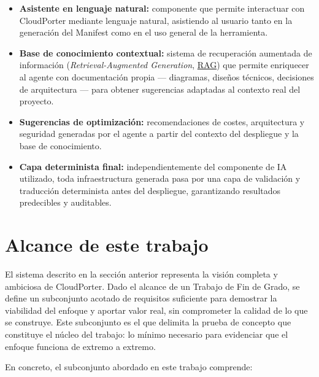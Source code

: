 \begin{itemize}
    \item \textbf{Asistente en lenguaje natural:} componente que permite
    interactuar con CloudPorter mediante lenguaje natural, asistiendo al
    usuario tanto en la generación del Manifest como en el uso general
    de la herramienta.

    \item \textbf{Base de conocimiento contextual:} sistema de recuperación
    aumentada de información (\textit{Retrieval-Augmented Generation}, \hyperlink{rag}{RAG}) que
    permite enriquecer al agente con documentación propia — diagramas, diseños
    técnicos, decisiones de arquitectura — para obtener sugerencias adaptadas
    al contexto real del proyecto.

    \item \textbf{Sugerencias de optimización:} recomendaciones de costes,
    arquitectura y seguridad generadas por el agente a partir del contexto
    del despliegue y la base de conocimiento.

    \item \textbf{Capa determinista final:} independientemente del componente
    de IA utilizado, toda infraestructura generada pasa por una capa de
    validación y traducción determinista antes del despliegue, garantizando
    resultados predecibles y auditables.

\end{itemize}

\section{Alcance de este trabajo}

El sistema descrito en la sección anterior representa la visión completa y ambiciosa de CloudPorter.
Dado el alcance de un Trabajo de Fin de Grado, se define un subconjunto acotado
de requisitos suficiente para demostrar la viabilidad del enfoque y aportar valor
real, sin comprometer la calidad de lo que se construye. Este subconjunto es el que
delimita la prueba de concepto que constituye el núcleo del trabajo: lo
mínimo necesario para evidenciar que el enfoque funciona de extremo a extremo.

En concreto, el subconjunto abordado en este trabajo comprende:

